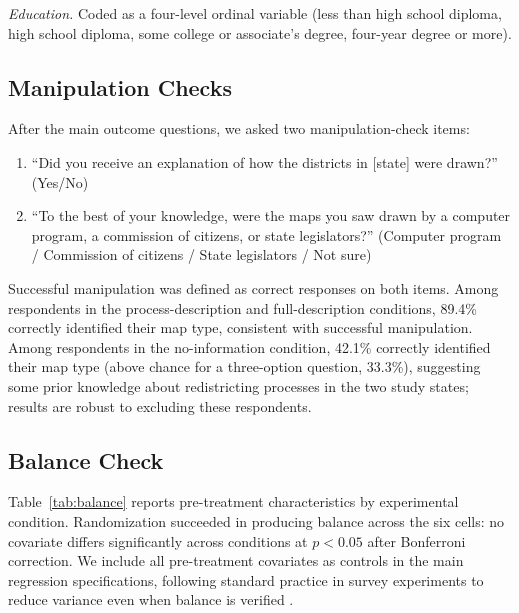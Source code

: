 \textit{Education.} Coded as a four-level ordinal variable (less than high school diploma, high school diploma, some college or associate's degree, four-year degree or more).

\subsection{Manipulation Checks}

After the main outcome questions, we asked two manipulation-check items:
\begin{enumerate}
    \item ``Did you receive an explanation of how the districts in [state] were drawn?'' (Yes/No)
    \item ``To the best of your knowledge, were the maps you saw drawn by a computer program, a commission of citizens, or state legislators?'' (Computer program / Commission of citizens / State legislators / Not sure)
\end{enumerate}

Successful manipulation was defined as correct responses on both items. Among respondents in the process-description and full-description conditions, 89.4\% correctly identified their map type, consistent with successful manipulation. Among respondents in the no-information condition, 42.1\% correctly identified their map type (above chance for a three-option question, 33.3\%), suggesting some prior knowledge about redistricting processes in the two study states; results are robust to excluding these respondents.

\subsection{Balance Check}

Table~\ref{tab:balance} reports pre-treatment characteristics by experimental condition. Randomization succeeded in producing balance across the six cells: no covariate differs significantly across conditions at $p < 0.05$ after Bonferroni correction. We include all pre-treatment covariates as controls in the main regression specifications, following standard practice in survey experiments to reduce variance even when balance is verified \citep{green2012field}.

